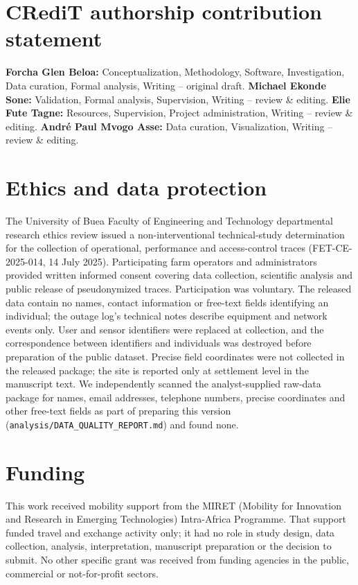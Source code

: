 \section*{CRediT authorship contribution statement}

\textbf{Forcha Glen Beloa:} Conceptualization, Methodology, Software, Investigation, Data curation, Formal analysis, Writing -- original draft. \textbf{Michael Ekonde Sone:} Validation, Formal analysis, Supervision, Writing -- review \& editing. \textbf{Elie Fute Tagne:} Resources, Supervision, Project administration, Writing -- review \& editing. \textbf{Andr\'e Paul Mvogo Asse:} Data curation, Visualization, Writing -- review \& editing.

\section*{Ethics and data protection}

The University of Buea Faculty of Engineering and Technology departmental research ethics review issued a non-interventional technical-study determination for the collection of operational, performance and access-control traces (FET-CE-2025-014, 14 July 2025). Participating farm operators and administrators provided written informed consent covering data collection, scientific analysis and public release of pseudonymized traces. Participation was voluntary. The released data contain no names, contact information or free-text fields identifying an individual; the outage log's technical notes describe equipment and network events only. User and sensor identifiers were replaced at collection, and the correspondence between identifiers and individuals was destroyed before preparation of the public dataset. Precise field coordinates were not collected in the released package; the site is reported only at settlement level in the manuscript text. We independently scanned the analyst-supplied raw-data package for names, email addresses, telephone numbers, precise coordinates and other free-text fields as part of preparing this version (\texttt{analysis/DATA\_QUALITY\_REPORT.md}) and found none.

\section*{Funding}

This work received mobility support from the MIRET (Mobility for Innovation and Research in Emerging Technologies) Intra-Africa Programme. That support funded travel and exchange activity only; it had no role in study design, data collection, analysis, interpretation, manuscript preparation or the decision to submit. No other specific grant was received from funding agencies in the public, commercial or not-for-profit sectors.

